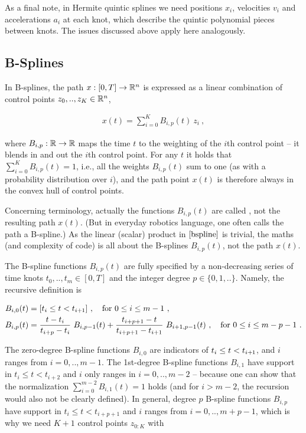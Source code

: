 As a final note, in Hermite quintic splines we need positions $x_i$, velocities $v_i$ and accelerations $a_i$ at each knot, which describe the quintic polynomial pieces between knots. The issues discussed above apply here analogously.

\subsection{B-Splines}

In B-splines, the path $x: [0,T] \to {\mathbb{R}}^n$ is expressed as a linear combination of control points $z_0,.., z_K \in {\mathbb{R}}^n$,

$$\begin{align}\label{bspline}
x(t) = \sum_{i=0}^K B_{i,p}(t)~ z_i ~,
\end{align}$$

where $B_{i,p}: {\mathbb{R}} \to {\mathbb{R}}$ maps the time $t$ to the weighting of the $i$th control point -- it blends in and out the $i$th control point. For any $t$ it  holds that $\sum_{i=0}^K B_{i,p}(t) = 1$, i.e., all the weights $B_{i,p}(t)$ sum to one (as with a probability distribution over $i$), and the path point $x(t)$ is therefore always in the convex hull of control points.

Concerning terminology, actually the functions $B_{i,p}(t)$ are called , not the resulting path $x(t)$. (But in everyday robotics language, one often calls the path a B-spline.) As the linear (scalar) product in $\eqref{bspline}$ is trivial, the maths (and complexity of code) is all about the B-splines $B_{i,p}(t)$, not the path $x(t)$.

The B-spline functions $B_{i,p}(t)$ are fully specified by a non-decreasing series of time knots $t_0,..,t_m \in [0,T]$ and the integer degree $p\in\{0,1,..\}$. Namely, the recursive definition is

$$\begin{align}
B_{i,0}(t) &= [t_i \le t < t_{i{{\hspace*{-.0pt}\text{\rm +}\hspace*{-.5pt}}1}}] ~,\quad \text{for $0\le i \le m-1$} ~,\\
B_{i,p}(t)
&= \frac{t-t_i}{t_{i+p}-t_i}~ B_{i,p-1}(t)
 +  \frac{t_{i+p+1}-t}{t_{i+p+1}-t_{i+1}}~ B_{i+1,p-1}(t)  ~,\quad \text{for $0\le i \le m-p-1$} ~.
\end{align}$$


The zero-degree B-spline functions $B_{i,0}$ are indicators of $t_i \le t < t_{i{{\hspace*{-.0pt}\text{\rm +}\hspace*{-.5pt}}1}}$, and $i$ ranges from $i=0,..,m-1$. The 1st-degree B-spline functions $B_{i,1}$ have support in $t_i \le t < t_{i+2}$ and $i$ only ranges in
$i=0,..,m-2$ -- because one can show that the normalization $\sum_{i=0}^{m-2} B_{i,1}(t) = 1$ holds (and for $i>m-2$, the recursion would also not be clearly defined). In general, degree $p$ B-spline functions $B_{i,p}$ have support in $t_i \le t < t_{i+p+1}$ and $i$ ranges from $i=0,..,m+p-1$, which is why we need $K+1$ control points $z_{0:K}$ with

